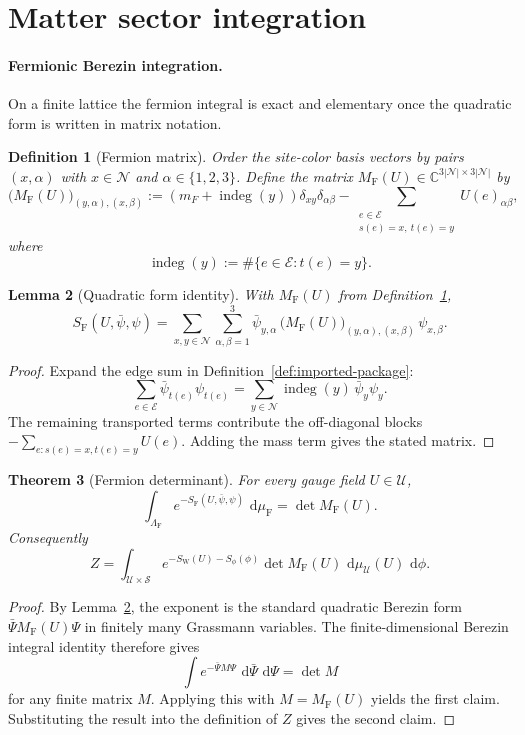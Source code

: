 \documentclass[11pt]{article}
\newtheorem{theorem}{Theorem}[section]
\newtheorem{definition}[theorem]{Definition}
\newtheorem{lemma}[theorem]{Lemma}
\theoremstyle{remark}
\newcommand{\C}{\mathbb C}
\newcommand{\mcN}{\mathcal N}
\newcommand{\mcE}{\mathcal E}
\newcommand{\mcU}{\mathscr U}
\newcommand{\mcS}{\mathscr S}
\newcommand{\dd}{\,\mathrm d}
\newcommand{\indeg}{\operatorname{indeg}}
\begin{document}
\section{Matter sector integration}
\label{sec:matter-integration}

\paragraph{Fermionic Berezin integration.}
On a finite lattice the fermion integral is exact and elementary once the
quadratic form is written in matrix notation.

\begin{definition}[Fermion matrix]
\label{def:fermion-matrix}
Order the site-color basis vectors by pairs $(x,\alpha)$ with
$x\in\mcN$ and $\alpha\in\{1,2,3\}$.  Define the matrix
$M_{\mathrm F}(U)\in\C^{3|\mcN|\times 3|\mcN|}$ by
\[
\bigl(M_{\mathrm F}(U)\bigr)_{(y,\alpha),(x,\beta)}
:=
\left(m_F+\indeg(y)\right)\delta_{xy}\delta_{\alpha\beta}
-\sum_{\substack{e\in\mcE\\ s(e)=x,\ t(e)=y}} U(e)_{\alpha\beta},
\]
where
\[
\indeg(y):=\#\{e\in\mcE:t(e)=y\}.
\]
\end{definition}

\begin{lemma}[Quadratic form identity]
\label{lem:fermion-quadratic}
With $M_{\mathrm F}(U)$ from Definition~\ref{def:fermion-matrix},
\[
S_{\mathrm F}(U,\bar\psi,\psi)
=
\sum_{x,y\in\mcN}\sum_{\alpha,\beta=1}^3
\bar\psi_{y,\alpha}\,
\bigl(M_{\mathrm F}(U)\bigr)_{(y,\alpha),(x,\beta)}\,
\psi_{x,\beta}.
\]
\end{lemma}
\begin{proof}
Expand the edge sum in Definition~\ref{def:imported-package}:
\[
\sum_{e\in\mcE}\bar\psi_{t(e)}\psi_{t(e)}
=
\sum_{y\in\mcN}\indeg(y)\,\bar\psi_y\psi_y.
\]
The remaining transported terms contribute the off-diagonal blocks
$-\sum_{e:s(e)=x,t(e)=y}U(e)$.  Adding the mass term gives the stated matrix.
\end{proof}

\begin{theorem}[Fermion determinant]
\label{thm:fermion-det}
For every gauge field $U\in\mcU$,
\[
\int_{\Lambda_{\mathrm F}}
e^{-S_{\mathrm F}(U,\bar\psi,\psi)}\,\dd\mu_{\mathrm F}
=
\det M_{\mathrm F}(U).
\]
Consequently
\[
Z
=
\int_{\mcU\times\mcS}
e^{-S_{\mathrm W}(U)-S_\phi(\phi)}\det M_{\mathrm F}(U)\,
\dd\mu_{\mcU}(U)\,\dd\phi.
\]
\end{theorem}
\begin{proof}
By Lemma~\ref{lem:fermion-quadratic}, the exponent is the standard quadratic
Berezin form $\bar\Psi M_{\mathrm F}(U)\Psi$ in finitely many Grassmann
variables.  The finite-dimensional Berezin integral identity therefore gives
\[
\int e^{-\bar\Psi M\Psi}\,\dd\bar\Psi\,\dd\Psi=\det M
\]
for any finite matrix $M$.  Applying this with $M=M_{\mathrm F}(U)$ yields the
first claim.  Substituting the result into the definition of $Z$ gives the
second claim.
\end{proof}
\end{document}
